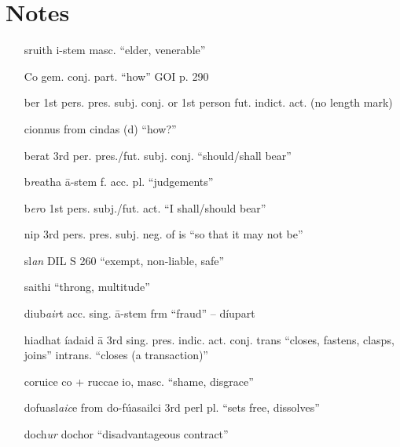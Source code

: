 \documentclass[11pt]{article}
\begin{document}
\section{Notes}

\begin{enumerate}
  \item[sruith] i-stem masc. \enquote{elder, venerable}

  \item[Co] gem. conj. part. \enquote{how} GOI p. 290

  \item[ber] 1st pers. pres. subj. conj. or 1st person fut. indict. act. (no length mark)

  \item[cionnus] from cindas (d) \enquote{how?}

  \item[berat] 3rd per. pres./fut. subj. conj. \enquote{should/shall bear}

  \item[b\emph{r}eatha] \={a}-stem f. acc. pl. \enquote{judgements}

  \item[b\emph{er}o] 1st pers. subj./fut. act. \enquote{I shall/should bear} 

  \item[nip] 3rd pers. pres. subj. neg. of is \enquote{so that it may not be}

  \item[sl\emph{an}] DIL S 260 \enquote{exempt, non-liable, safe}

  \item[saithi] \enquote{throng, multitude}

  \item[diub\emph{air}t] acc. sing. \={a}-stem frm \enquote{fraud} -- d\'{i}upart

  \item[hiadhat] \'{i}adaid \={a} 3rd sing. pres. indic. act. conj. trans \enquote{closes, fastens, clasps, joins} intrans. \enquote{closes (a transaction)}

  \item[coruice] co + ruccae io, masc. \enquote{shame, disgrace}

  \item[dofuasl\emph{aic}e] from do-f\'{u}asailci 3rd perl pl. \enquote{sets free, dissolves}

  \item[doch\emph{ur}] dochor \enquote{disadvantageous contract}


\end{enumerate}
\end{document}

